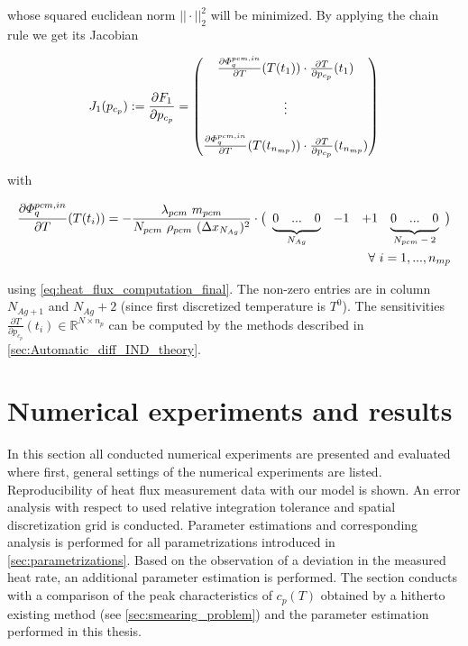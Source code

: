 \documentclass{scrartcl}[12pt, halfparskip]
\numberwithin{equation}{section}
\numberwithin{figure}{section}
\numberwithin{table}{section}
\newcommand\undermat[2]{%
	\makebox[0pt][l]{$\smash{\underbrace{\phantom{%
					\begin{matrix}#2\end{matrix}}}_{\text{$#1$}}}$}#2}
\begin{document}
whose squared euclidean norm $|| \cdot ||_2^2$ will be minimized. 
By applying the chain rule we get its Jacobian

\begin{equation}
	J_1(p_{c_p}) := \frac{\partial F_1}{\partial p_{c_p}} =
	\begin{pmatrix}
		\frac{\partial \varPhi_{q}^{pcm,in}}{\partial T}(T(t_1)) \cdot \frac{\partial T}{\partial p_{c_p}}(t_1) \\
		\textcolor{white}{} \\
		\vdots \\
		\textcolor{white}{} \\
		\frac{\partial \varPhi_{q}^{pcm,in}}{\partial T}(T(t_{n_{mp}})) \cdot \frac{\partial T}{\partial p_{c_p}}(t_{n_{mp}}) \\
	\end{pmatrix}
	\label{eq:optimization_jacobian}
\end{equation}

with

\begin{align}
	\frac{\partial \varPhi_{q}^{pcm,in}}{\partial T}(T(t_i)) = - \frac{\lambda_{pcm} \ m_{pcm}}{N_{pcm} \ \rho_{pcm} \ (\Delta x_{N_{Ag}})^2} \cdot
	\left(\begin{array}{cccccccc}
	\undermat{N_{Ag}}{0 & ... & 0} & -1 & +1 & \undermat{N_{pcm}-2}{0 & ... & 0}
	\end{array}\right) \\[2ex]
	\forall \ i = 1,...,n_{mp} \nonumber
\end{align}

using \cref{eq:heat_flux_computation_final}. The non-zero entries are in column $N_{Ag+1}$ and $N_{Ag}+2$ (since first discretized temperature is $T^0$). 
The sensitivities $\frac{\partial T}{\partial p_{c_p}}(t_i) \in \mathbb{R}^{N \times n_p}$ can be computed by the methods described in \cref{sec:Automatic_diff_IND_theory}. 


\newpage
\section{Numerical experiments and results}
\label{sec:numerical_experiments}

In this section all conducted numerical experiments are presented and evaluated where first, general settings of the numerical experiments are listed. Reproducibility of heat flux measurement data with our model is shown. An error analysis with respect to used relative integration tolerance and spatial discretization grid is conducted. Parameter estimations and corresponding analysis is performed for all parametrizations introduced in \cref{sec:parametrizations}. Based on the observation of a deviation in the measured heat rate, an additional parameter estimation is performed. The section conducts with a comparison of the peak characteristics of $c_p(T)$ obtained by a hitherto existing method (see \cref{sec:smearing_problem}) and the parameter estimation performed in this thesis.
\end{document}
